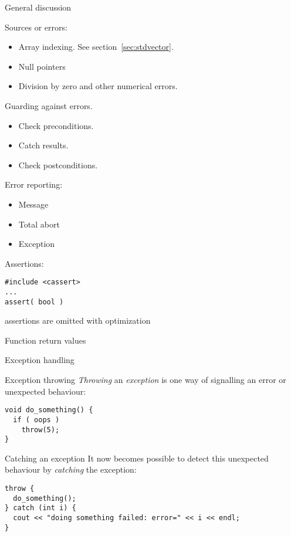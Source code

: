
 {General discussion}

Sources or errors:
\begin{itemize}
\item Array indexing. See section~\ref{sec:stdvector}.
\item Null pointers
\item Division by zero and other numerical errors.
\end{itemize}

Guarding against errors.
\begin{itemize}
\item Check preconditions.
\item Catch results.
\item Check postconditions.
\end{itemize}

Error reporting:
\begin{itemize}
\item Message
\item Total abort
\item Exception
\end{itemize}

Assertions:
\begin{verbatim}
#include <cassert>
...
assert( bool )
\end{verbatim}
assertions are omitted with optimization

Function return values

 {Exception handling}

\begin{block}{Exception throwing}
  \label{sl:exception-throw}
  \emph{Throwing} an \emph{exception}%
   is one way of signalling an error or
  unexpected behaviour:
\begin{verbatim}
void do_something() {
  if ( oops )
    throw(5);
}
\end{verbatim}
\end{block}

\begin{block}{Catching an exception}
  \label{sl:exception-catch}
  It now becomes possible to detect this unexpected behaviour by
  \emph{catching}
  the exception:
\begin{verbatim}
throw {
  do_something();
} catch (int i) {
  cout << "doing something failed: error=" << i << endl;
}
\end{verbatim}
\end{block}

